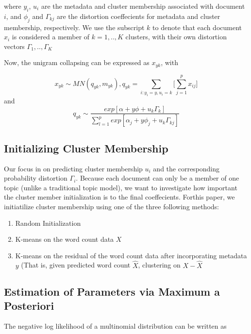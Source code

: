 \documentclass[12pt]{article}
\begin{document}
where $y_i$, $u_i$ are the metadata and cluster membership associated
with document $i$, and $\phi_j$ and $\Gamma_{kj}$ are the distortion
coeffecients for metadata and cluster membership, respectively. We use
the subscript $k$ to denote that each document $x_i$ is considered a
member of $k = 1,..,K$ clusters, with their own distortion vectors
$\Gamma_1,..,\Gamma_K$

Now, the unigram collapsing can be expressed as $x_{yk}$, with

\begin{equation}
 x_{yk} \sim MN(q_{yk},m_{yk}), q_{yk} = \sum\limits_{i: y_i = y, u_i = k} \big[\sum_{j = 1}^{p} {x_{ij}} \big]
\end{equation}
and 
\begin{equation}
q_{yk} \sim \frac{exp[\alpha + y \phi  + u_k \Gamma_{k}]}{\sum_{l=1}^{p} exp[\alpha_j + y \phi_j+ u_k \Gamma_{kj} ]}
\end{equation}

\subsection{Initializing Cluster Membership}

Our focus in on predicting cluster membership $u_i$ and the
corresponding probability distortion $\Gamma_i$. Because each document can only be a member of one topic (unlike a traditional topic model), we want to investigate how important the cluster member initialization is to the final coeffecients. 
Forthis paper, we initiatilize cluster membership using one of the three following
methods:

\begin{enumerate}
\def\labelenumi{\arabic{enumi}.}
\itemsep1pt\parskip0pt
\item
  Random Initialization
\item
  K-means on the word count data $X$
\item
  K-means on the residual of the word count data after incorporating
  metadata $y$ (That is, given predicted word count $\hat{X}$,
  clustering on $X-\hat{X}$
\end{enumerate}

\subsection{Estimation of Parameters via Maximum a
Posteriori}\label{estimation-of-parameters-via-maximum-a-posteriori}

The negative log likelihood of a multinomial distribution can be written
as
\end{document}

